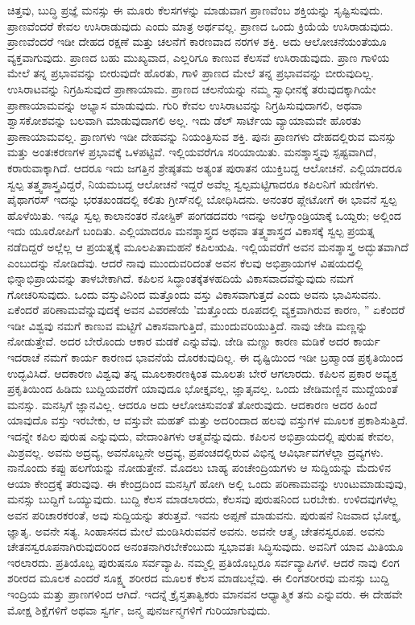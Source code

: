 ಚಿತ್ತವು, ಬುದ್ಧಿ ಪ್ರಜ್ಞೆ ಮನಸ್ಸು ಈ ಮೂರು ಕೆಲಸಗಳನ್ನು ಮಾಡುವಾಗ ಪ್ರಾಣವೆಂಬ ಶಕ್ತಿಯನ್ನು ಸೃಷ್ಟಿಸುವುದು. ಪ್ರಾಣವೆಂದರೆ ಕೇವಲ ಉಸಿರಾಡುವುದು ಎಂದು ಮಾತ್ರ ಅರ್ಥವಲ್ಲ. ಪ್ರಾಣದ ಒಂದು ಕ್ರಿಯೆಯೆ ಉಸಿರಾಡುವುದು. ಪ್ರಾಣವೆಂದರೆ ಇಡೀ ದೇಹದ ರಕ್ಷಣೆ ಮತ್ತು ಚಲನೆಗೆ ಕಾರಣವಾದ ನರಗಳ ಶಕ್ತಿ. ಅದು ಆಲೋಚನೆಯಂತೆಯೂ ವ್ಯಕ್ತವಾಗುವುದು. ಪ್ರಾಣದ ಬಹು ಮುಖ್ಯವಾದ, ಎಲ್ಲರಿಗೂ ಕಾಣುವ ಕೆಲಸವೆ ಉಸಿರಾಡುವುದು. ಪ್ರಾಣ ಗಾಳಿಯ ಮೇಲೆ ತನ್ನ ಪ್ರಭಾವವನ್ನು ಬೀರುವುದೇ ಹೊರತು, ಗಾಳಿ ಪ್ರಾಣದ ಮೇಲೆ ತನ್ನ ಪ್ರಭಾವವನ್ನು ಬೀರುವುದಿಲ್ಲ. ಉಸಿರಾಟವನ್ನು ನಿಗ್ರಹಿಸುವುದೆ ಪ್ರಾಣಾಯಾಮ. ಪ್ರಾಣದ ಚಲನೆಯನ್ನು ನಮ್ಮ ಸ್ವಾಧೀನಕ್ಕೆ ತರುವುದಕ್ಕಾಗಿಯೇ ಪ್ರಾಣಾಯಾಮವನ್ನು ಅಭ್ಯಾಸ ಮಾಡುವುದು. ಗುರಿ ಕೇವಲ ಉಸಿರಾಟವನ್ನು ನಿಗ್ರಹಿಸುವುದಾಗಲಿ, ಅಥವಾ ಶ್ವಾಸಕೋಶವನ್ನು ಬಲವಾಗಿ ಮಾಡುವುದಾಗಲಿ ಅಲ್ಲ. ಇದು ಡೆಲ್ ಸಾರ್ಟೆಯ ವ್ಯಾಯಾಮವೇ ಹೊರತು ಪ್ರಾಣಾಯಾಮವಲ್ಲ. ಪ್ರಾಣಗಳು ಇಡೀ ದೇಹವನ್ನು ನಿಯಂತ್ರಿಸುವ ಶಕ್ತಿ. ಪುನಃ ಪ್ರಾಣಗಳು ದೇಹದಲ್ಲಿರುವ ಮನಸ್ಸು ಮತ್ತು ಅಂತಃಕರಣಗಳ ಪ್ರಭಾವಕ್ಕೆ ಒಳಪಟ್ಟಿವೆ. ಇಲ್ಲಿಯವರೆಗೂ ಸರಿಯಾಯಿತು. ಮನಶ್ಶಾಸ್ತ್ರವು ಸ್ಪಷ್ಟವಾಗಿದೆ, ಕರಾರುವಾಕ್ಕಾಗಿದೆ. ಆದರೂ ಇದು ಜಗತ್ತಿನ ಶ್ರೇಷ್ಠತಮ ಅತ್ಯಂತ ಪುರಾತನ ಯುಕ್ತಿಬದ್ದ ಆಲೋಚನೆ. ಎಲ್ಲಿಯಾದರೂ ಸ್ವಲ್ಪ ತತ್ತ್ವಶಾಸ್ತ್ರವಿದ್ದರೆ, ನಿಯಮಬದ್ದ ಆಲೋಚನೆ ಇದ್ದರೆ ಅವೆಲ್ಲ ಸ್ವಲ್ಪಮಟ್ಟಿಗಾದರೂ ಕಪಿಲನಿಗೆ ಋಣಿಗಳು. ಪೈಥಾಗರಸ್ ಇದನ್ನು ಭರತಖಂಡದಲ್ಲಿ ಕಲಿತು ಗ್ರೀಸ್‌ನಲ್ಲಿ ಬೋಧಿಸಿದನು. ಅನಂತರ ಪ್ಲೇಟೋಗೆ ಈ ಭಾವನೆ ಸ್ವಲ್ಪ ಹೊಳೆಯಿತು. ಇನ್ನೂ ಸ್ವಲ್ಪ ಕಾಲಾನಂತರ ನೋಸ್ಟಿಕ್ ಪಂಗಡದವರು ಇದನ್ನು ಅಲೆಗ್ಸಾಂಡ್ರಿಯಾಕ್ಕೆ ಒಯ್ದರು; ಅಲ್ಲಿಂದ ಇದು ಯೂರೋಪಿಗೆ ಬಂದಿತು. ಎಲ್ಲಿಯಾದರೂ ಮನಶ್ಶಾಸ್ತ್ರದ ಅಥವಾ ತತ್ತ್ವಶಾಸ್ತ್ರದ ವಿಕಾಸಕ್ಕೆ ಸ್ವಲ್ಪ ಪ್ರಯತ್ನ ನಡೆದಿದ್ದರೆ ಅಲ್ಲೆಲ್ಲ ಆ ಪ್ರಯತ್ನಕ್ಕೆ ಮೂಲಪಿತಾಮಹನೆ ಕಪಿಲಋಷಿ. ಇಲ್ಲಿಯವರೆಗೆ ಅವನ ಮನಶ್ಶಾಸ್ತ್ರ ಅದ್ಭುತವಾಗಿದೆ ಎಂಬುದನ್ನು ನೋಡಿದೆವು. ಆದರೆ ನಾವು ಮುಂದುವರಿದಂತೆ ಅವನ ಕೆಲವು ಅಭಿಪ್ರಾಯ\-ಗಳ ವಿಷಯದಲ್ಲಿ ಭಿನ್ನಾಭಿಪ್ರಾಯವನ್ನು ತಾಳಬೇಕಾಗಿದೆ. ಕಪಿಲನ ಸಿದ್ಧಾಂತಕ್ಕೆ\break ತಳಹದಿಯೆ ವಿಕಾಸವಾದವೆನ್ನುವುದು ನಮಗೆ ಗೋಚರಿಸುವುದು. ಒಂದು ವಸ್ತುವಿನಿಂದ ಮತ್ತೊಂದು ವಸ್ತು ವಿಕಾಸವಾಗುತ್ತದೆ ಎಂದು ಅವನು ಭಾವಿಸುವನು. ಏಕೆಂದರೆ ಪರಿಣಾಮವೆನ್ನುವುದಕ್ಕೆ ಅವನ ವಿವರಣೆಯೆ 'ಮತ್ತೊಂದು ರೂಪದಲ್ಲಿ ವ್ಯಕ್ತವಾಗಿರುವ ಕಾರಣ, '' ಏಕೆಂದರೆ ಇಡೀ ವಿಶ್ವವು ನಮಗೆ ಕಾಣುವ ಮಟ್ಟಿಗೆ ವಿಕಾಸವಾಗುತ್ತಿದೆ, ಮುಂದುವರಿಯುತ್ತಿದೆ. ನಾವು ಜೇಡಿ ಮಣ್ಣನ್ನು ನೋಡುತ್ತೇವೆ. ಅದರ ಬೇರೊಂದು ಆಕಾರ ಮಡಕೆ ಎನ್ನುವೆವು. ಜೇಡಿ ಮಣ್ಣು ಕಾರಣ ಮಡಿಕೆ ಅದರ ಕಾರ್ಯ ಇದರಾಚೆ ನಮಗೆ ಕಾರ್ಯ ಕಾರಣದ ಭಾವನೆಯೆ ದೊರಕುವುದಿಲ್ಲ. ಈ ದೃಷ್ಟಿಯಿಂದ ಇಡೀ ಬ್ರಹ್ಮಾಂಡ ಪ್ರಕೃತಿಯಿಂದ ಉದ್ಭವಿಸಿದೆ. ಆದಕಾರಣ ವಿಶ್ವವು ತನ್ನ ಮೂಲಕಾರಣಕ್ಕಿಂತ ಮೂಲತಃ ಬೇರೆ ಆಗಲಾರದು. ಕಪಿಲನ ಪ್ರಕಾರ ಅವ್ಯಕ್ತ ಪ್ರಕೃತಿಯಿಂದ ಹಿಡಿದು ಬುದ್ದಿಯವರೆಗೆ ಯಾವುದೂ ಭೋಕ್ತೃವಲ್ಲ, ಜ್ಞಾತೃವಲ್ಲ. ಒಂದು ಜೇಡಿಮಣ್ಣಿನ ಮುದ್ದೆಯಂತೆ ಮನಸ್ಸು. ಮನಸ್ಸಿಗೆ ಜ್ಞಾನವಿಲ್ಲ. ಆದರೂ ಅದು ಆಲೋಚಿಸುವಂತೆ ತೋರುವುದು. ಆದಕಾರಣ ಅದರ ಹಿಂದೆ ಯಾವುದೊ ವಸ್ತು ಇರಬೇಕು, ಆ ವಸ್ತುವೇ ಮಹತ್ ಮತ್ತು ಅದರಿಂದಾದ ಹಲವು ವಸ್ತುಗಳ ಮೂಲಕ ಪ್ರಕಾಶಿಸುತ್ತಿದೆ. ಇದನ್ನೇ ಕಪಿಲ ಪುರುಷ ಎನ್ನುವುದು, ವೇದಾಂತಿಗಳು ಆತ್ಮವೆನ್ನುವುದು. ಕಪಿಲನ ಅಭಿಪ್ರಾಯದಲ್ಲಿ ಪುರುಷ ಕೇವಲ, ಮಿಶ್ರವಲ್ಲ. ಅವನು ಅದ್ರವ್ಯ, ಅವನೊಬ್ಬನೇ ಅದ್ರವ್ಯ, ಪ್ರಪಂಚದಲ್ಲಿರುವ ವಿಭಿನ್ನ ಆವಿರ್ಭಾವಗಳೆಲ್ಲಾ ದ್ರವ್ಯಗಳು. ನಾನೊಂದು ಕಪ್ಪು ಹಲಗೆಯನ್ನು ನೋಡುತ್ತೇನೆ. ಮೊದಲು ಬಾಹ್ಯ ಪಂಚೇಂದ್ರಿಯಗಳು ಆ ಸುದ್ದಿಯನ್ನು ಮೆದುಳಿನ ಆಯಾ ಕೇಂದ್ರಕ್ಕೆ ತರುವುವು. ಈ ಕೇಂದ್ರದಿಂದ ಮನಸ್ಸಿಗೆ ಹೋಗಿ ಅಲ್ಲಿ ಒಂದು ಪರಿಣಾಮವನ್ನು ಉಂಟುಮಾಡುವುವು, ಮನಸ್ಸು ಬುದ್ದಿಗೆ ಒಯ್ಯುವುದು. ಬುದ್ದಿ ಕೆಲಸ ಮಾಡಲಾರದು, ಕೆಲಸವು ಪುರುಷನಿಂದ ಬರಬೇಕು. ಉಳಿದವುಗಳೆಲ್ಲ ಅವನ ಪರಿಚಾರಕರಂತೆ, ಅವು ಸುದ್ದಿಯನ್ನು ತರುತ್ತವೆ. ಇವನು ಅಪ್ಪಣೆ ಮಾಡುವನು. ಪುರುಷನೆ ನಿಜವಾದ ಭೋಕ್ತೃ, ಜ್ಞಾತೃ. ಅವನೇ ಸತ್ಯ. ಸಿಂಹಾಸನದ ಮೇಲೆ ಮಂಡಿಸಿರುವವನೆ ಅವನು. ಅವನೇ ಆತ್ಮ, ಚೇತನಸ್ವರೂಪ. ಅವನು ಚೇತನಸ್ವರೂಪನಾಗಿರುವುದರಿಂದ ಅನಂತನಾಗಿರಬೇಕೆಂಬುದು ಸ್ವಭಾವತಃ ಸಿದ್ಧಿಸುವುದು. ಅವನಿಗೆ ಯಾವ ಮಿತಿಯೂ ಇರಲಾರದು. ಪ್ರತಿಯೊಬ್ಬ ಪುರುಷನೂ ಸರ್ವವ್ಯಾಪಿ. ನಮ್ಮಲ್ಲಿ ಪ್ರತಿಯೊಬ್ಬರೂ ಸರ್ವವ್ಯಾಪಿಗಳೆ. ಆದರೆ ನಾವು ಲಿಂಗ ಶರೀರದ ಮೂಲಕ ಎಂದರೆ ಸೂಕ್ಷ್ಮ ಶರೀರದ ಮೂಲಕ ಕೆಲಸ ಮಾಡಬಲ್ಲೆವು. ಈ ಲಿಂಗಶರೀರವು ಮನಸ್ಸು ಬುದ್ದಿ ಇಂದ್ರಿಯ ಮತ್ತು ಪ್ರಾಣಗಳಿಂದ ಆಗಿದೆ. ಇದನ್ನೆ ಕ್ರೈಸ್ತತಾತ್ವಿಕರು ಮಾನವನ ಆಧ್ಯಾತ್ಮಿಕ ತನು ಎನ್ನುವರು. ಈ ದೇಹವೇ ಮೋಕ್ಷ ಶಿಕ್ಷೆಗಳಿಗೆ ಅಥವಾ ಸ್ವರ್ಗ, ಜನ್ಮ ಪುನರ್ಜನ್ಮಗಳಿಗೆ ಗುರಿಯಾಗುವುದು. 